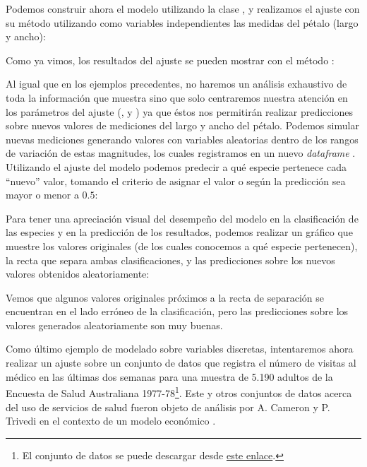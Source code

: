  
 Podemos construir ahora el modelo utilizando la clase , y realizamos el ajuste con su método  utilizando como variables independientes las medidas del pétalo (largo y ancho):
 
  
 
 Como ya vimos, los resultados del ajuste se pueden mostrar con el método :
 
 
 Al igual que en los ejemplos precedentes, no haremos un análisis exhaustivo de toda la información que muestra  sino que solo centraremos nuestra atención en los parámetros del ajuste (,  y ) ya que éstos nos permitirán realizar predicciones sobre nuevos valores de mediciones del largo y ancho del pétalo. Podemos simular nuevas mediciones generando valores con variables aleatorias dentro de los rangos de variación de estas magnitudes, los cuales registramos en un nuevo \textit{dataframe} . Utilizando el ajuste del modelo podemos predecir a qué especie pertenece cada ``nuevo'' valor, tomando el criterio de asignar el valor  o  según la predicción sea mayor o menor a $0.5$:
 
 
 Para tener una apreciación visual del desempeño del modelo en la clasificación de las especies y en la predicción de los resultados, podemos realizar un gráfico que muestre los valores originales (de los cuales conocemos a qué especie pertenecen), la recta que separa ambas clasificaciones, y las predicciones sobre los nuevos valores obtenidos aleatoriamente:
 
 
 Vemos que algunos valores originales próximos a la recta de separación se encuentran en el lado erróneo de la clasificación, pero las predicciones sobre los valores generados aleatoriamente son muy buenas.
 
 Como último ejemplo de modelado sobre variables discretas, intentaremos ahora realizar un ajuste sobre un conjunto de datos que registra el número de visitas al médico en las últimas dos semanas para una muestra de 5.190 adultos de la Encuesta de Salud Australiana 1977-78\footnote{El conjunto de datos se puede descargar desde \href{https://vincentarelbundock.github.io/Rdatasets/csv/AER/DoctorVisits.csv}{este enlace}.}. Este y otros conjuntos de datos acerca del uso de servicios de salud fueron objeto de análisis por A. Cameron y P. Trivedi en el contexto de un modelo económico \cite{cameron1986}.
 
